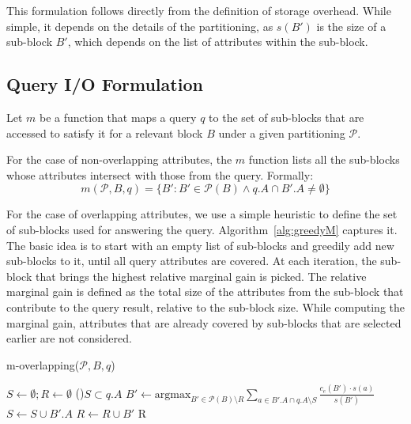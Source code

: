 This formulation follows directly from the definition of storage overhead.
While simple, it depends on the details of the partitioning, as $s(B')$ is the
size of a sub-block $B'$, which depends on the list of attributes within the
sub-block.

\subsection{Query I/O Formulation}
\noindent
Let $m$ be a function that maps a query $q$ to the set of sub-blocks that are
accessed to satisfy it for a relevant block $B$ under a given partitioning
$\mathcal{P}$. 

For the case of non-overlapping attributes, the $m$ function lists all the 
sub-blocks whose attributes intersect with those from the query. Formally:
\begin{equation}
m(\mathcal{P}, B, q) = \{B': B'\in \mathcal{P}(B) \wedge q.A \cap B'.A \ne \emptyset\}  
\end{equation}

For the case of overlapping attributes, we use a simple heuristic to define the
set of sub-blocks used for answering the query. Algorithm~\ref{alg:greedyM}
captures it. The basic idea is to start with an empty list of sub-blocks and
greedily add new sub-blocks to it, until all query attributes are covered.  At
each iteration, the sub-block that brings the highest relative marginal gain
is  picked. The relative marginal gain is defined as  the total size of the
attributes from the sub-block that contribute to the query result, relative to
the sub-block size. While computing the marginal gain, attributes that are
already covered by sub-blocks that are selected earlier are not considered.

%
\begin{algorithm}[ht]
\scriptsize
\caption{m-overlapping($\mathcal{P}, B, q$)}
\label{alg:greedyM}
$S\leftarrow \emptyset; R\leftarrow \emptyset$ 
\While(){$S \subset q.A$}{
  $B' \leftarrow \mbox{argmax}_{B'\in\mathcal{P}(B)\setminus R} \sum_{a\in B'.A \cap q.A \setminus S} \frac{c_e(B') \cdot s(a)}{s(B')}$
  $S \leftarrow S \cup B'.A$
  $R\leftarrow R \cup B'$
}
\Return R 
\end{algorithm} 


